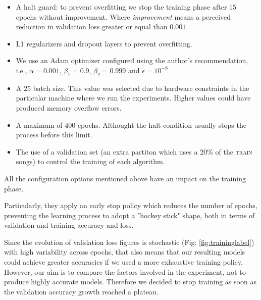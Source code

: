 \begin{itemize}
  \item {
    A halt guard: to prevent overfitting we stop the training phase after $15$ epochs without improvement. Where {\it improvement} means a perceived reduction in validation loss greater or equal than $0.001$
  }
  \item {
    L1 regularizers and dropout layers to prevent overfitting.
  }
  \item {
    We use an Adam optimizer \citep{35} configured using the author's recommendation, i.e., $\alpha = 0.001$, $\beta_1 = 0.9$, $\beta_2 = 0.999$ and $\epsilon= 10^{-8}$
  }

  \item{
    A $25$ batch size. This value was selected due to hardware constraints in the particular machine where we run the experiments. Higher values could have produced memory overflow errors.
  }

  \item {
    A maximum of $400$ epochs. Althought the halt condition usually stops the process before this limit.
  }

  \item {The use of a validation set (an extra partiton which uses a $20\%$ of the \textsc{train} songs) to control the training of each algorithm.}
\end{itemize}



All the configuration options mentioned above have an impact on the training phase.



Particularly, they apply an early stop policy which reduces the number of epochs, preventing the learning process to adopt a "hockey stick" shape, both in terms of validation and training accuracy and loss.


Since the evolution of validation loss figures is stochastic (Fig: \ref{fig:traininglabel}) with high variability across epochs, that also means that our resulting models could achieve greater accuracies if we used a more exhaustive training policy. However, our aim is to compare the factors involved in the experiment, not to produce highly accurate models. Therefore we decided to stop training as soon as the validation accuracy growth reached a plateau.


